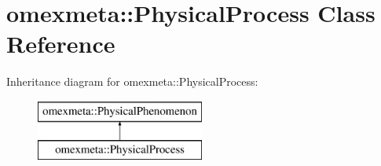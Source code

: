 \hypertarget{classomexmeta_1_1PhysicalProcess}{}\section{omexmeta\+:\+:Physical\+Process Class Reference}
\label{classomexmeta_1_1PhysicalProcess}
Inheritance diagram for omexmeta\+:\+:Physical\+Process\+:\begin{figure}[H]
\begin{center}
\leavevmode
\includegraphics[height=2.000000cm]{classomexmeta_1_1PhysicalProcess}
\end{center}
\end{figure}
